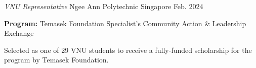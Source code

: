 \begin{cventries}
{  \cventry
    {\textit{VNU Representative}}
    {Ngee Ann Polytechnic}
    {Singapore}
    {Feb. 2024}
    {
      \begin{cvitems}
        \item {\textbf{Program:} Temasek Foundation Specialist's Community Action \& Leadership Exchange}
        \item {Selected as one of 29 VNU students to receive a fully-funded scholarship for the program by Temasek Foundation.}
      \end{cvitems}
    }

  }
\end{cventries}